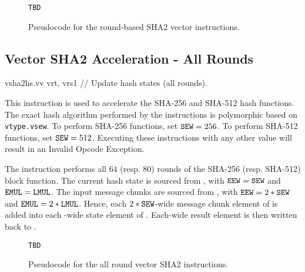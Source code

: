 \begin{figure}[h]
\begin{lstlisting}[language=pseudo]
TBD
\end{lstlisting}
\caption{Pseudocode for the round-based SHA2 vector instructions.}
\label{fig:pseudo:sha:per-round}
\end{figure}

\subsection{Vector SHA2 Acceleration - All Rounds}
\label{sec:vector:sha2:all-round}

\begin{cryptoisa}
vsha2hs.vv vrt, vrs1      // Update hash states (all rounds).
\end{cryptoisa}

This instruction is used to accelerate the SHA-256 and SHA-512
hash functions.
The exact hash algorithm performed by the instructions is
polymorphic based on {\tt vtype.vsew}.
To perform SHA-256 functions, set ${\tt SEW}=256$.
To perform SHA-512 functions, set ${\tt SEW}=512$.
Executing these instructions with any other \SEW value will
result in an Invalid Opcode Exception.

The  instruction performs all
$64$ (resp. $80$) rounds of the SHA-256 (resp. SHA-512) block function.
The current hash state is sourced from \vrt,
with ${\tt EEW}={\tt SEW}$ and ${\tt EMUL}={\tt LMUL}$.
The input message chunks are sourced from ,
with ${\tt EEW}=2*{\tt SEW}$ and ${\tt EMUL}=2*{\tt LMUL}$.
Hence, each $2*{\tt SEW}$-wide message chunk element of  is added into each
\SEW-wide state element of \vrt.
Each\SEW-wide result element is then written back to \vrt.

\begin{figure}[h]
\begin{lstlisting}[language=pseudo]
TBD
\end{lstlisting}
\caption{Pseudocode for the all round vector SHA2 instructions.}
\label{fig:pseudo:sha:all-round}
\end{figure}
